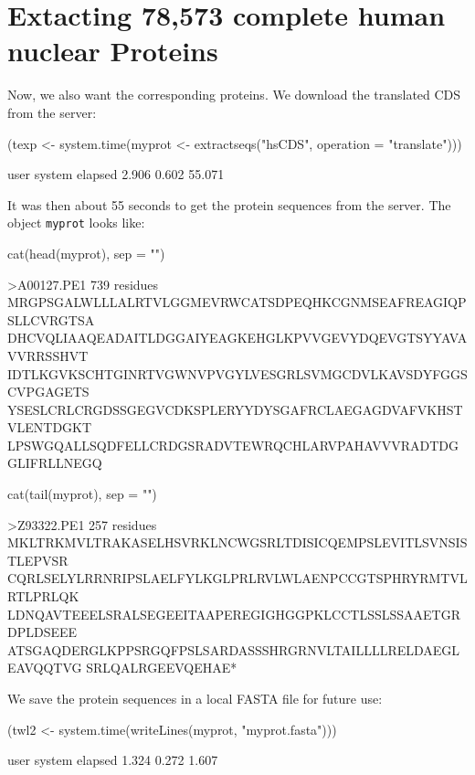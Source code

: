 \documentclass{article}
\begin{document}
\section{Extacting 78,573 complete human nuclear Proteins}

Now, we also want the corresponding proteins. We download the translated 
CDS from the server:

\begin{Schunk}
\begin{Sinput}
 (texp <- system.time(myprot <- extractseqs("hsCDS", operation = "translate")))
\end{Sinput}
\begin{Soutput}
   user  system elapsed 
  2.906   0.602  55.071 
\end{Soutput}
\end{Schunk}

It was then about 55 seconds
to get the protein sequences from the server. The object \texttt{myprot} looks
like:

\begin{Schunk}
\begin{Sinput}
 cat(head(myprot), sep = "\n")
\end{Sinput}
\begin{Soutput}
>A00127.PE1              739 residues
MRGPSGALWLLLALRTVLGGMEVRWCATSDPEQHKCGNMSEAFREAGIQPSLLCVRGTSA
DHCVQLIAAQEADAITLDGGAIYEAGKEHGLKPVVGEVYDQEVGTSYYAVAVVRRSSHVT
IDTLKGVKSCHTGINRTVGWNVPVGYLVESGRLSVMGCDVLKAVSDYFGGSCVPGAGETS
YSESLCRLCRGDSSGEGVCDKSPLERYYDYSGAFRCLAEGAGDVAFVKHSTVLENTDGKT
LPSWGQALLSQDFELLCRDGSRADVTEWRQCHLARVPAHAVVVRADTDGGLIFRLLNEGQ
\end{Soutput}
\begin{Sinput}
 cat(tail(myprot), sep = "\n")
\end{Sinput}
\begin{Soutput}
>Z93322.PE1              257 residues
MKLTRKMVLTRAKASELHSVRKLNCWGSRLTDISICQEMPSLEVITLSVNSISTLEPVSR
CQRLSELYLRRNRIPSLAELFYLKGLPRLRVLWLAENPCCGTSPHRYRMTVLRTLPRLQK
LDNQAVTEEELSRALSEGEEITAAPEREGIGHGGPKLCCTLSSLSSAAETGRDPLDSEEE
ATSGAQDERGLKPPSRGQFPSLSARDASSSHRGRNVLTAILLLLRELDAEGLEAVQQTVG
SRLQALRGEEVQEHAE*
\end{Soutput}
\end{Schunk}

We save the protein sequences in a local FASTA file for future use:

\begin{Schunk}
\begin{Sinput}
 (twl2 <- system.time(writeLines(myprot, "myprot.fasta")))
\end{Sinput}
\begin{Soutput}
   user  system elapsed 
  1.324   0.272   1.607 
\end{Soutput}
\end{Schunk}
\end{document}
